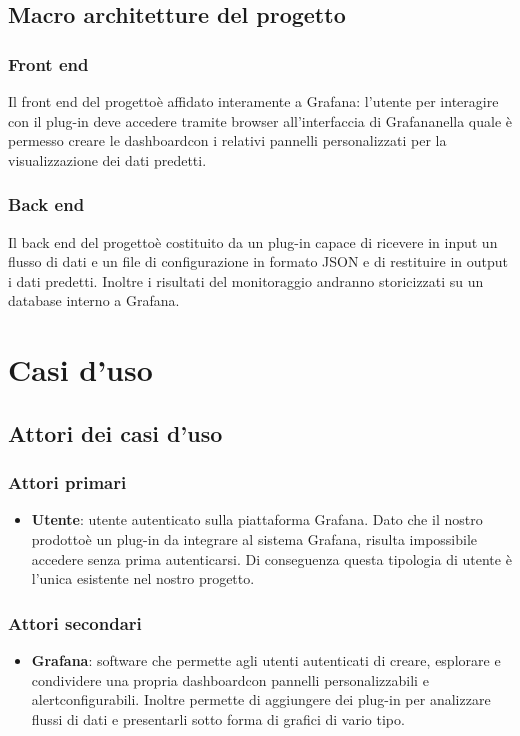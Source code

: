 	\subsection{Macro architetture del progetto}
		\subsubsection{Front end}
		Il front end del progetto\glosp è affidato interamente a Grafana\glo: l'utente per interagire con il plug-in deve accedere tramite browser all'interfaccia di Grafana\glosp nella quale è permesso creare le dashboard\glosp con i relativi pannelli personalizzati per la visualizzazione dei dati predetti. 
		\subsubsection{Back end}
		Il back end del progetto\glosp è costituito da un plug-in capace di ricevere in input un flusso di dati e un file di configurazione in formato JSON e di restituire in output i dati predetti. Inoltre i risultati del monitoraggio andranno storicizzati su un database interno a Grafana\glo.
\section{Casi d'uso}
	\subsection{Attori dei casi d'uso}
		\subsubsection{Attori primari}
		\begin{itemize}
			\item \textbf{Utente}: utente autenticato sulla piattaforma Grafana\glo. Dato che il nostro prodotto\glosp è un plug-in da integrare al sistema Grafana\glo, risulta impossibile accedere senza prima autenticarsi. Di conseguenza questa tipologia di utente è l'unica esistente nel nostro progetto\glo.
		\end{itemize}
		\subsubsection{Attori secondari}
		\begin{itemize}
			\item \textbf{Grafana}\glo: software che permette agli utenti autenticati di creare, esplorare e condividere una propria dashboard\glosp con pannelli personalizzabili e alert\glosp configurabili. Inoltre permette di aggiungere dei plug-in per analizzare flussi di dati e presentarli sotto forma di grafici di vario tipo.
		\end{itemize}